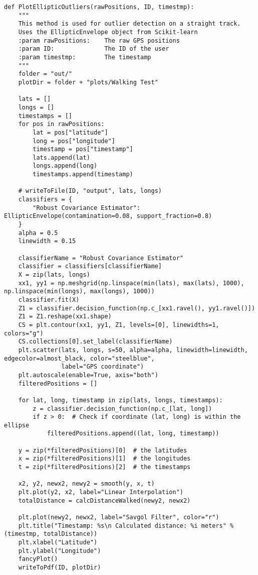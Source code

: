 \begin{verbatim}
def PlotEllipticOutliers(rawPositions, ID, timestmp):
    """
    This method is used for outlier detection on a straight track.
    Uses the EllipticEnvelope object from Scikit-learn
    :param rawPositions:    The raw GPS positions
    :param ID:              The ID of the user
    :param timestmp:        The timestamp
    """
    folder = "out/"
    plotDir = folder + "plots/Walking Test"

    lats = []
    longs = []
    timestamps = []
    for pos in rawPositions:
        lat = pos["latitude"]
        long = pos["longitude"]
        timestamp = pos["timestamp"]
        lats.append(lat)
        longs.append(long)
        timestamps.append(timestamp)

    # writeToFile(ID, "output", lats, longs)
    classifiers = {
        "Robust Covariance Estimator": EllipticEnvelope(contamination=0.08, support_fraction=0.8)
    }
    alpha = 0.5
    linewidth = 0.15

    classifierName = "Robust Covariance Estimator"
    classifier = classifiers[classifierName]
    X = zip(lats, longs)
    xx1, yy1 = np.meshgrid(np.linspace(min(lats), max(lats), 1000), np.linspace(min(longs), max(longs), 1000))
    classifier.fit(X)
    Z1 = classifier.decision_function(np.c_[xx1.ravel(), yy1.ravel()])
    Z1 = Z1.reshape(xx1.shape)
    CS = plt.contour(xx1, yy1, Z1, levels=[0], linewidths=1, colors="g")
    CS.collections[0].set_label(classifierName)
    plt.scatter(lats, longs, s=50, alpha=alpha, linewidth=linewidth, edgecolor=almost_black, color="steelblue",
                label="GPS coordinate")
    plt.autoscale(enable=True, axis="both")
    filteredPositions = []

    for lat, long, timestamp in zip(lats, longs, timestamps):
        z = classifier.decision_function(np.c_[lat, long])
        if z > 0:  # Check if coordinate (lat, long) is within the ellipse
            filteredPositions.append((lat, long, timestamp))

    y = zip(*filteredPositions)[0]  # the latitudes
    x = zip(*filteredPositions)[1]  # the longitudes
    t = zip(*filteredPositions)[2]  # the timestamps

    x2, y2, newx2, newy2 = smooth(y, x, t)
    plt.plot(y2, x2, label="Linear Interpolation")
    totalDistance = calcDistanceWalked(newy2, newx2)

    plt.plot(newy2, newx2, label="Savgol Filter", color="r")
    plt.title("Timestamp: %s\n Calculated distance: %i meters" % (timestmp, totalDistance))
    plt.xlabel("Latitude")
    plt.ylabel("Longitude")
    fancyPlot()
    writeToPdf(ID, plotDir)

\end{verbatim}